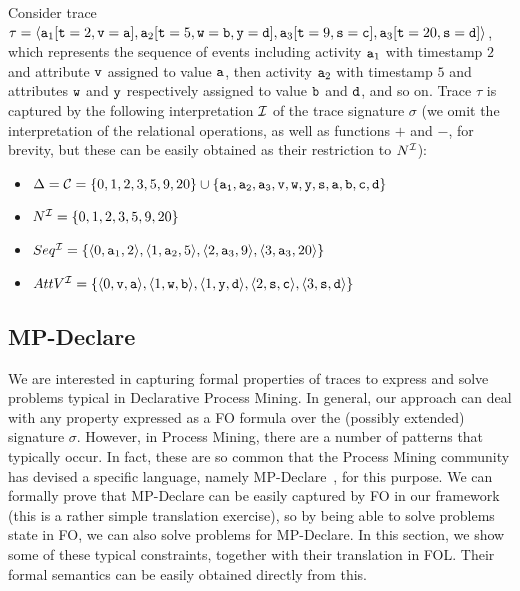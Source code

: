 \begin{example}\label{ex:1}
Consider trace
$\tau=\langle\mathtt{a}_1[
	\mathtt{t}=2,
	\mathtt{v}=\mathtt{a}
],
\mathtt{a}_2[
	\mathtt{t}=5,
	\mathtt{w}=\mathtt{b},
	\mathtt{y}=\mathtt{d}
],
\mathtt{a}_3[
	\mathtt{t}=9,
	\mathtt{s}=\mathtt{c}
],
\mathtt{a}_3[
	\mathtt{t}=20,
	\mathtt{s}=\mathtt{d}
]\rangle$, which represents the sequence of events including
activity $\mathtt{a}_1$ with timestamp $2$ and attribute $\mathtt{v}$ assigned to
value $\mathtt{a}$,
then activity $\mathtt{a}_2$ with timestamp $5$ and
attributes $\mathtt{w}$ and $\mathtt{y}$ respectively assigned to value $\mathtt{b}$ and
$\mathtt{d}$, and so on.
Trace $\tau$ is captured by the following interpretation $\mathcal{I}$ of the
trace signature $\sigma$ (we omit the interpretation of the relational
operations, as well as functions $+$ and $-$, for brevity, but these can be
easily obtained as their
restriction to $N^{\mathcal{I}}$):
\begin{itemize}
	\item
		$\Delta=\mathcal{C}=
			\{0,1,2,3,5,9,20\}\cup
				\{
					\mathtt{a_1},\mathtt{a_2},\mathtt{a_3},
					\mathtt{v},\mathtt{w}, \mathtt{y},\mathtt{s},
					\mathtt{a},\mathtt{b},\mathtt{c},\mathtt{d}
				\}
		$
	\item $N^{\mathcal{I}}=\{0,1,2,3,5,9,20\}$
	\item $Seq^{\mathcal{I}}=\{\langle 0,\mathtt{a}_1, 2\rangle,\langle 1,\mathtt{a}_2,5\rangle,\langle 2,\mathtt{a}_3,9\rangle,\langle 3,\mathtt{a}_3,20\rangle\}$
	\item $AttV^{\mathcal{I}}=\{
							\langle 0,\mathtt{v},\mathtt{a}\rangle,
							\langle 1,\mathtt{w},\mathtt{b}\rangle,
							\langle 1,\mathtt{y},\mathtt{d}\rangle,
							\langle 2,\mathtt{s},\mathtt{c}\rangle,
							\langle 3, \mathtt{s},\mathtt{d}\rangle\}$
\end{itemize}
\end{example}


\subsection{MP-Declare}
We are interested in capturing formal properties of traces to express and
solve problems typical in Declarative Process Mining.
In general, our approach can deal with any property expressed
as a FO formula over the (possibly extended) signature
$\sigma$.
However, in Process Mining, there are
a number of patterns that typically occur. In fact,
these are so common that the Process Mining community has
devised a specific language, namely MP-Declare~\cite{DBLP:journals/eswa/BurattinMS16},
for this purpose.
We can formally prove that MP-Declare can be easily captured
by FO in our framework (this is a rather simple translation
exercise), so
by being able to solve problems state in FO, we can also
solve problems for MP-Declare. In this section,
we show some of these typical constraints, together with
their translation in FOL. Their formal semantics can be
easily obtained directly from this.

